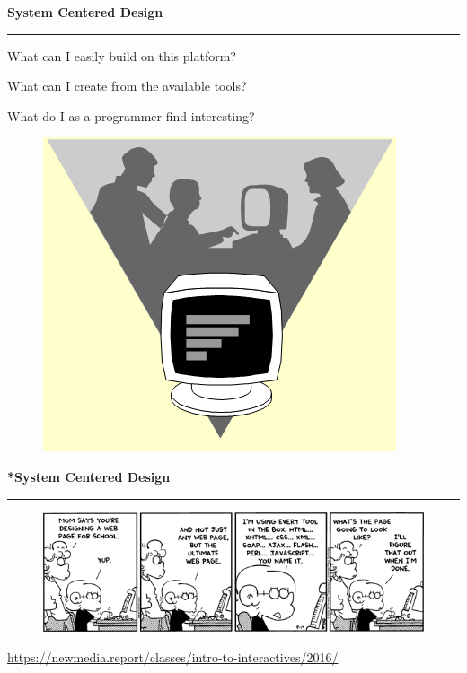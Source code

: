 \documentclass[pdf]{beamer}
\begin{document}
\begin{frame}
\vspace{8mm}
\textcolor{myBlue}{\textbf{\Large{System Centered Design}}}

\textcolor{red}{\rule{10cm}{1mm}}

\Large{What can I easily build on this platform?}
\bigskip
 
\Large{What can I create from the available tools?}
\bigskip

\Large{What do I as a programmer find interesting?}

\begin{figure}[b]
    	\includegraphics[scale = 0.45]{moro2.PNG}
\end{figure}
\end{frame}



\begin{frame}
\vspace{8mm}
\textcolor{myBlue}{\textbf{\Large{*System Centered Design}}}

\textcolor{red}{\rule{10cm}{1mm}}

\begin{figure}[b]
    \includegraphics[scale = 0.8]{foxtrot-webdesign.png}
\end{figure}

\url{https://newmedia.report/classes/intro-to-interactives/2016/}
\end{frame}
\end{document}
